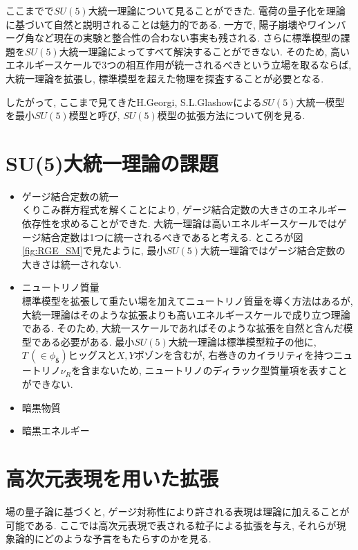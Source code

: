 %
%
ここまでで$SU(5)$大統一理論について見ることができた.
電荷の量子化を理論に基づいて自然と説明されることは魅力的である.
一方で, 陽子崩壊やワインバーグ角など現在の実験と整合性の合わない事実も残される.
さらに標準模型の課題を$SU(5)$大統一理論によってすべて解決することができない.
そのため, 高いエネルギースケールで3つの相互作用が統一されるべきという立場を取るならば, 大統一理論を拡張し, 標準模型を超えた物理を探査することが必要となる.

したがって, ここまで見てきたH.Georgi, S.L.Glashowによる$SU(5)$大統一模型を最小$SU(5)$模型と呼び, $SU(5)$模型の拡張方法について例を見る.
\section{SU(5)大統一理論の課題}
\begin{itemize}
  \item ゲージ結合定数の統一\\
        くりこみ群方程式を解くことにより, ゲージ結合定数の大きさのエネルギー依存性を求めることができた.
        大統一理論は高いエネルギースケールではゲージ結合定数は1つに統一されるべきであると考える.
        ところが図\ref{fig:RGE_SM}で見たように, 最小$SU(5)$大統一理論ではゲージ結合定数の大きさは統一されない.
  \item ニュートリノ質量\\
        標準模型を拡張して重たい場を加えてニュートリノ質量を導く方法はあるが, 大統一理論はそのような拡張よりも高いエネルギースケールで成り立つ理論である.
        そのため, 大統一スケールであればそのような拡張を自然と含んだ模型である必要がある.
        最小$SU(5)$大統一理論は標準模型粒子の他に, $T \,(\in \phi_{\bar{\bm{5}}})$ヒッグスと$X,Y$ボゾンを含むが, 右巻きのカイラリティを持つニュートリノ$\nu_R$を含まないため, ニュートリノのディラック型質量項を表すことができない. 
  \item 暗黒物質
  \item 暗黒エネルギー
\end{itemize}
\section{高次元表現を用いた拡張}
場の量子論に基づくと, ゲージ対称性により許される表現は理論に加えることが可能である.
ここでは高次元表現で表される粒子による拡張を与え, それらが現象論的にどのような予言をもたらすのかを見る.
